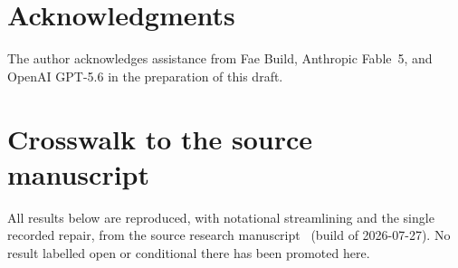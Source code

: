 \documentclass[11pt,reqno]{amsart}
\theoremstyle{definition}
\theoremstyle{remark}
\begin{document}
\section*{Acknowledgments}
The author acknowledges assistance from Fae Build, Anthropic Fable~5, and
OpenAI GPT-5.6 in the preparation of this draft.

\appendix

\section{Crosswalk to the source manuscript}\label{sec:crosswalk}
All results below are reproduced, with notational streamlining and the single
recorded repair, from the source research manuscript~\cite{MWman} (build of
2026-07-27).  No result labelled open or conditional there has been promoted
here.
\end{document}

